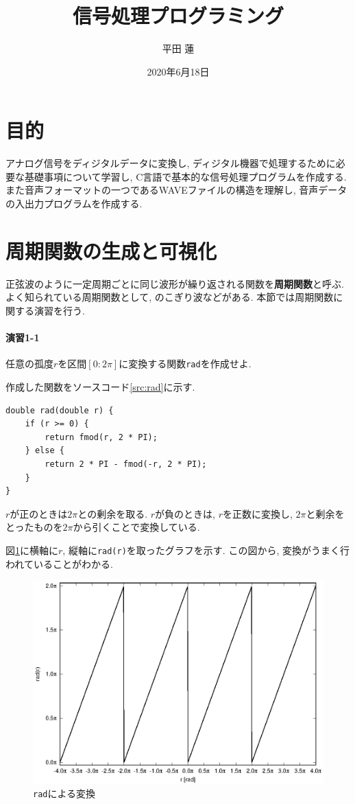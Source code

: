 \documentclass[titlepage]{jsarticle}
\title{信号処理プログラミング}
\author{平田 蓮}
\date{2020年6月18日}
\begin{document}
\maketitle
\section{目的}
    アナログ信号をディジタルデータに変換し, ディジタル機器で処理するために必要な基礎事項について学習し,
    C言語で基本的な信号処理プログラムを作成する.
    また音声フォーマットの一つであるWAVEファイルの構造を理解し, 音声データの入出力プログラムを作成する.

\section{周期関数の生成と可視化}
    正弦波のように一定周期ごとに同じ波形が繰り返される関数を\textbf{周期関数}と呼ぶ.
    よく知られている周期関数として, のこぎり波などがある.
    本節では周期関数に関する演習を行う.

    \paragraph{演習1-1} 任意の孤度$r$を区間$[0:2\pi]$に変換する関数\verb|rad|を作成せよ.

        作成した関数をソースコード\ref{src:rad}に示す.

        \begin{lstlisting}[caption=rad.c, label=src:rad]
double rad(double r) {
    if (r >= 0) {
        return fmod(r, 2 * PI);
    } else {
        return 2 * PI - fmod(-r, 2 * PI);
    }
}
        \end{lstlisting}

        $r$が正のときは$2\pi$との剰余を取る.
        $r$が負のときは, $r$を正数に変換し, $2\pi$と剰余をとったものを$2\pi$から引くことで変換している.

        図\ref{fig:rad}に横軸に$r$, 縦軸に\verb|rad(r)|を取ったグラフを示す.
        この図から, 変換がうまく行われていることがわかる.

        \begin{figure}[ht]
            \centering
            \includegraphics[width=12cm]{images/rad.eps}
            \cprotect\caption{\verb|rad|による変換}
            \label{fig:rad}
        \end{figure}
\end{document}
